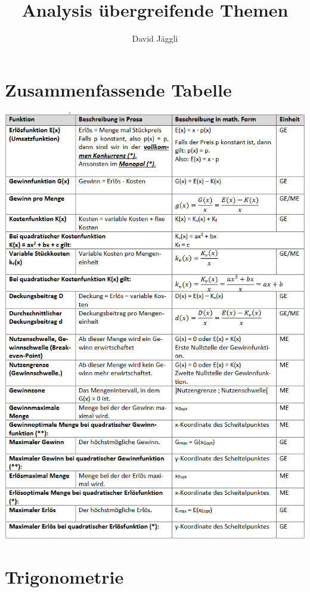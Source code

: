 \documentclass[12pt]{scrartcl}
\author{David Jäggli}
\title{Analysis übergreifende Themen}
\begin{document}
\maketitle

\tableofcontents

\section{Zusammenfassende Tabelle}
\begin{center}
\includegraphics[width=16cm]{img/Wirtschaftstabeue-math.png}
\end{center}

\newpage
\section{Trigonometrie}
\end{document}
